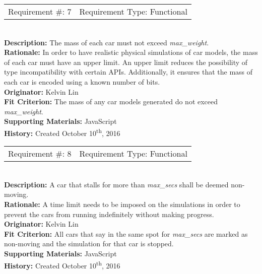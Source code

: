 \documentclass[12pt, titlepage]{article}
\begin{document}
\begin{reqbox}
%
\begin{tabular}{cc}
Requirement \#: 7 & Requirement Type: Functional \\
\end{tabular} \\
%
\textbf{Description:} The mass of each car must not exceed \textit{max\_weight}. 
\\
\textbf{Rationale:} In order to have realistic physical simulations of car 
models, the mass of each car must have an upper limit. An upper limit reduces 
the possibility of type incompatibility with certain APIs. Additionally, it 
ensures that the mass of each car is encoded using a known number of bits.\\
\textbf{Originator:} Kelvin Lin\\
\textbf{Fit Criterion:} The mass of any car models generated do not exceed 
\textit{max\_weight}.\\
%  
\textbf{Supporting Materials:} JavaScript \\
\textbf{History:} Created October 10\textsuperscript{th}, 2016
%
\end{reqbox}

\begin{reqbox}
%
\begin{tabular}{cc}
Requirement \#: 8 & Requirement Type: Functional \\
\end{tabular} \\
%
\textbf{Description:} A car that stalls for more than \textit{max\_secs} shall 
be deemed non-moving. \\
\textbf{Rationale:} A time limit needs to be imposed on the simulations in order 
to prevent the cars from running indefinitely without making progress. \\
\textbf{Originator:} Kelvin Lin\\
\textbf{Fit Criterion:} All cars that say in the same spot for 
\textit{max\_secs} are marked as non-moving and the simulation for that car is 
stopped.\\
%  
\textbf{Supporting Materials:} JavaScript \\
\textbf{History:} Created October 10\textsuperscript{th}, 2016
%
\end{reqbox}
\end{document}
